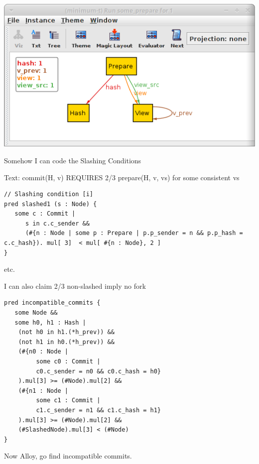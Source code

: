 \documentclass{beamer}
\begin{document}
\begin{frame}
\includegraphics[width=\textwidth]{circle.png}
\end{frame}

\begin{frame}[fragile]{Somehow I can code the Slashing Conditions}

Text: commit(H, v) REQUIRES 2/3 prepare(H, v, vs) for some consistent vs

\begin{verbatim}
// Slashing condition [i]
pred slashed1 (s : Node) {
   some c : Commit |
      s in c.c_sender &&
      (#{n : Node | some p : Prepare | p.p_sender = n && p.p_hash = c.c_hash}). mul[ 3]  < mul[ #{n : Node}, 2 ]
}
\end{verbatim}

etc.
\end{frame}

\begin{frame}[fragile]{I can also claim 2/3 non-slashed imply no fork}

\begin{verbatim}
pred incompatible_commits {
   some Node &&
   some h0, h1 : Hash |
    (not h0 in h1.(*h_prev)) &&
    (not h1 in h0.(*h_prev)) &&
    (#{n0 : Node |
         some c0 : Commit |
         c0.c_sender = n0 && c0.c_hash = h0}
    ).mul[3] >= (#Node).mul[2] &&
    (#{n1 : Node |
         some c1 : Commit |
         c1.c_sender = n1 && c1.c_hash = h1}
    ).mul[3] >= (#Node).mul[2] &&
    (#SlashedNode).mul[3] < (#Node)
}
\end{verbatim}

Now Alloy, go find incompatible commits.
\end{frame}
\end{document}
